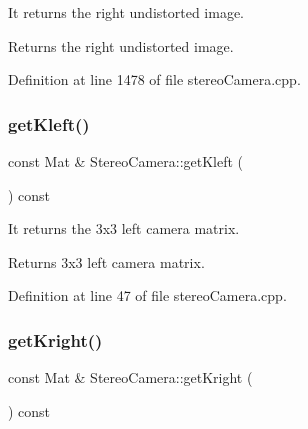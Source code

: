 It returns the right undistorted image. 

\begin{DoxyReturn}{Returns}
the right undistorted image. 
\end{DoxyReturn}


Definition at line 1478 of file stereo\+Camera.\+cpp.


\begin{DoxyCode}{0}

\end{DoxyCode}
\mbox{\label{classStereoCamera_a932e0ebd63c3e9a93b33c1846459aadc}} 
\subsubsection{\texorpdfstring{getKleft()}{getKleft()}}
{\footnotesize\ttfamily const Mat \& Stereo\+Camera\+::get\+Kleft (\begin{DoxyParamCaption}{ }\end{DoxyParamCaption}) const}



It returns the 3x3 left camera matrix. 

\begin{DoxyReturn}{Returns}
3x3 left camera matrix. 
\end{DoxyReturn}


Definition at line 47 of file stereo\+Camera.\+cpp.


\begin{DoxyCode}{0}

\end{DoxyCode}
\mbox{\label{classStereoCamera_a6f9e53e949b77cd19e28a4ec92034a3d}} 
\subsubsection{\texorpdfstring{getKright()}{getKright()}}
{\footnotesize\ttfamily const Mat \& Stereo\+Camera\+::get\+Kright (\begin{DoxyParamCaption}{ }\end{DoxyParamCaption}) const}



